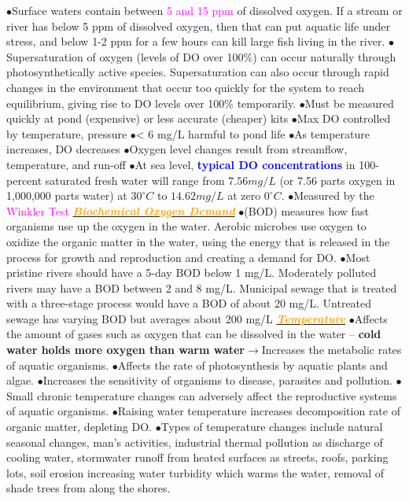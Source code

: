 \documentclass{article}
\newcommand{\ddd}{$\bullet$}
\newcommand{\blue}[1]{\textcolor{blue}{#1}}
\newcommand{\pink}[1]{\textcolor{magenta}{#1}}
\newcommand{\orange}[1]{\textcolor{orange}{#1}}
\newcommand{\mysubsection}[1]{\underline{\textbf{{\textit{\orange{#1}}}}}}
\newcommand{\vocab}[1]{{\pink{#1}}}
\begin{document}
\begin{multicols*}{4}
            \ddd Surface waters contain between \pink{5 and 15 ppm} of dissolved oxygen. If a stream or river has below 5 ppm of dissolved oxygen, then that can put aquatic life under stress, and below 1-2 ppm for a few hours can kill large fish living in the river.
            \ddd Supersaturation of oxygen (levels of DO over 100\%) can occur naturally through photosynthetically active species. Supersaturation can also occur through rapid changes in the environment that occur too quickly for the system to reach equilibrium, giving rise to DO levels over 100\% temporarily.
                        \ddd Must be measured quickly at pond (expensive) or less accurate (cheaper) kits
            \ddd Max DO controlled by temperature, pressure
            \ddd < 6 mg/L harmful to pond life
            \ddd As temperature increases, DO decreases
            \ddd Oxygen level changes result from streamflow, temperature, and run-off
            \ddd At sea level, \textbf{\blue{typical DO concentrations}} in 100-percent saturated fresh water will range from $7.56 mg/L$ (or 7.56 parts oxygen in 1,000,000 parts water) at $30^\circ C$ to $14.62 mg/L$ at zero $0^\circ C$.
            \ddd Measured by the \vocab{Winkler Test}
        \mysubsection{Biochemical Oxygen Demand}
            \ddd (BOD) measures how fast organisms use up the oxygen in the water. Aerobic microbes use oxygen to oxidize the organic matter in the water, using the energy that is released in the process for growth and reproduction and creating a demand for DO.
            \ddd Most pristine rivers should have a 5-day BOD below 1 mg/L. Moderately polluted rivers may have a BOD between 2 and 8 mg/L. Municipal sewage that is treated with a three-stage process would have a BOD of about 20 mg/L. Untreated sewage has varying BOD but averages about 200 mg/L    
        \mysubsection{Temperature}
             \ddd Affects the amount of gases such as oxygen that can be dissolved in the water – \textbf{cold water holds more oxygen than warm water}$ \rightarrow $Increases the metabolic rates of aquatic organisms. 
             \ddd Affects the rate of photosynthesis by aquatic plants and algae. 
             \ddd Increases the sensitivity of organisms to disease, parasites and pollution. 
             \ddd Small chronic temperature changes can adversely affect the reproductive systems of aquatic organisms. 
             \ddd Raising water temperature increases decomposition rate of organic matter, depleting DO. \ddd Types of temperature changes include natural seasonal changes, man’s activities, industrial thermal pollution as discharge of cooling water, stormwater runoff from heated surfaces as streets, roofs, parking lots, soil erosion increasing water turbidity which warms the water, removal of shade trees from along the shores.

\end{multicols*}
\end{document}
